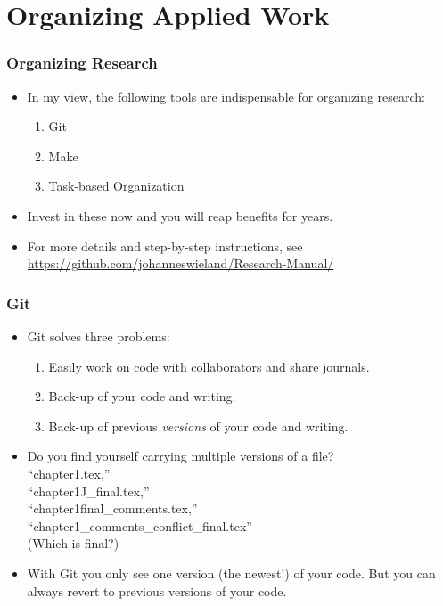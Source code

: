 \documentclass[english,xcolor=svgnames]{beamer}
\begin{document}
\section{Organizing Applied Work}

\begin{frame}
\frametitle[alignment=center]{Organizing Research}
\begin{itemize}
	\item In my view, the following tools are indispensable for organizing research: 
	\begin{enumerate}
	\item Git
	\item Make
	\item Task-based Organization
\end{enumerate}
\item Invest in these now and you will reap benefits for years.
\item For more details and step-by-step instructions, see \href{https://github.com/johanneswieland/Research-Manual/}{https://github.com/johanneswieland/Research-Manual/}
\end{itemize}
\end{frame}


\begin{frame}
\frametitle[alignment=center]{Git}
\begin{itemize}
	\item Git solves three problems:
	\begin{enumerate}
		\item Easily work on code with collaborators and share journals.
		\item Back-up of your code and writing.
		\item Back-up of previous \emph{versions} of your code and writing.
	\end{enumerate}
	\item Do you find yourself carrying multiple versions of a file? \\ ``chapter1.tex,'' \\ ``chapter1J\_final.tex,''  \\ ``chapter1final\_comments.tex,'' \\ ``chapter1\_comments\_conflict\_final.tex''\\
	 (Which is final?)
	 \item With Git you only see one version (the newest!) of your code. But you can always revert to previous versions of your code.
\end{itemize}
\end{frame}
\end{document}
